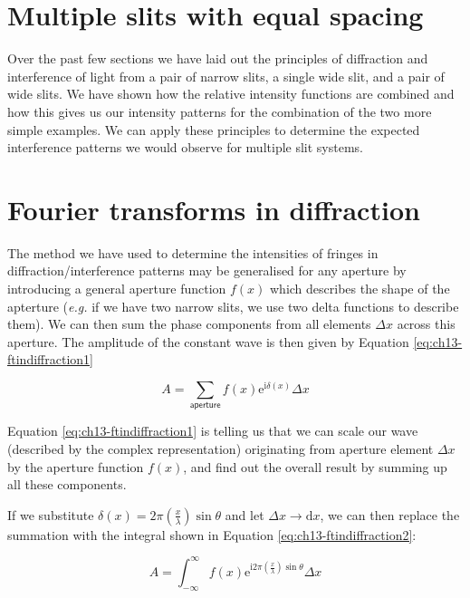 \documentclass[
]{book}
\begin{document}
\hypertarget{sec:ch13-diffmultipleslits}{%
\section{Multiple slits with equal spacing}\label{sec:ch13-diffmultipleslits}}

Over the past few sections we have laid out the principles of diffraction and interference of light from a pair of narrow slits, a single wide slit, and a pair of wide slits. We have shown how the relative intensity functions are combined and how this gives us our intensity patterns for the combination of the two more simple examples. We can apply these principles to determine the expected interference patterns we would observe for multiple slit systems.

\hypertarget{sec:ch13-ftindiffraction}{%
\section{Fourier transforms in diffraction}\label{sec:ch13-ftindiffraction}}

The method we have used to determine the intensities of fringes in diffraction/interference patterns may be generalised for any aperture by introducing a general aperture function \(f(x)\) which describes the shape of the apterture (\emph{e.g.} if we have two narrow slits, we use two delta functions to describe them). We can then sum the phase components from all elements \(\Delta x\) across this aperture. The amplitude of the constant wave is then given by Equation \eqref{eq:ch13-ftindiffraction1}

\begin{equation}
A = \sum_{\textsf{aperture}} f(x) \mathrm{e}^{\mathrm{i}\delta(x)} \Delta x
\label{eq:ch13-ftindiffraction1}
\end{equation}

Equation \eqref{eq:ch13-ftindiffraction1} is telling us that we can scale our wave (described by the complex representation) originating from aperture element \(\Delta x\) by the aperture function \(f(x)\), and find out the overall result by summing up all these components.

If we substitute \(\delta(x) = 2\pi \left(\frac{x}{\lambda}\right) \sin \theta\) and let \(\Delta x \rightarrow \mathrm{d}x\), we can then replace the summation with the integral shown in Equation \eqref{eq:ch13-ftindiffraction2}:

\begin{equation}
A = \int_{-\infty}^{\infty} f(x) \mathrm{e}^{\mathrm{i}2\pi \left(\frac{x}{\lambda}\right) \sin \theta} \Delta x
\label{eq:ch13-ftindiffraction2}
\end{equation}
\end{document}
